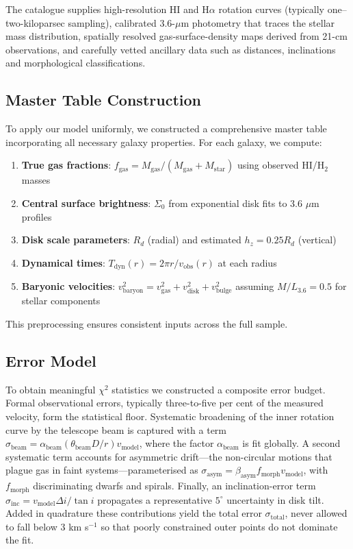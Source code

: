 \documentclass[twocolumn,prd,amsmath,amssymb,aps,superscriptaddress,nofootinbib]{revtex4-2}
\newcommand{\chisq}{\chi^2}
\begin{document}
The catalogue supplies high-resolution HI and H$\alpha$ rotation curves (typically one–two-kiloparsec sampling), calibrated 3.6-$\mu$m photometry that traces the stellar mass distribution, spatially resolved gas-surface-density maps derived from 21-cm observations, and carefully vetted ancillary data such as distances, inclinations and morphological classifications.

\subsection{Master Table Construction}

To apply our model uniformly, we constructed a comprehensive master table incorporating all necessary galaxy properties. For each galaxy, we compute:

\begin{enumerate}
\item \textbf{True gas fractions}: $f_{\text{gas}} = M_{\text{gas}}/(M_{\text{gas}} + M_{\text{star}})$ using observed HI/H$_2$ masses
\item \textbf{Central surface brightness}: $\Sigma_0$ from exponential disk fits to 3.6 $\mu$m profiles
\item \textbf{Disk scale parameters}: $R_d$ (radial) and estimated $h_z = 0.25 R_d$ (vertical)
\item \textbf{Dynamical times}: $T_{\text{dyn}}(r) = 2\pi r/v_{\text{obs}}(r)$ at each radius
\item \textbf{Baryonic velocities}: $v_{\text{baryon}}^2 = v_{\text{gas}}^2 + v_{\text{disk}}^2 + v_{\text{bulge}}^2$ assuming $M/L_{3.6} = 0.5$ for stellar components
\end{enumerate}

This preprocessing ensures consistent inputs across the full sample.

\subsection{Error Model}

To obtain meaningful $\chisq$ statistics we constructed a composite error budget.  Formal observational errors, typically three-to-five per cent of the measured velocity, form the statistical floor.  Systematic broadening of the inner rotation curve by the telescope beam is captured with a term $\sigma_{\mathrm{beam}} = \alpha_{\mathrm{beam}} (\theta_{\mathrm{beam}} D/r) v_{\mathrm{model}}$, where the factor $\alpha_{\mathrm{beam}}$ is fit globally.  A second systematic term accounts for asymmetric drift—the non-circular motions that plague gas in faint systems—parameterised as $\sigma_{\mathrm{asym}} = \beta_{\mathrm{asym}} f_{\mathrm{morph}} v_{\mathrm{model}}$, with $f_{\mathrm{morph}}$ discriminating dwarfs and spirals.  Finally, an inclination-error term $\sigma_{\mathrm{inc}} = v_{\mathrm{model}} \Delta i/\tan i$ propagates a representative $5^{\circ}$ uncertainty in disk tilt.  Added in quadrature these contributions yield the total error $\sigma_{\mathrm{total}}$, never allowed to fall below 3 km s$^{-1}$ so that poorly constrained outer points do not dominate the fit.
\end{document}
